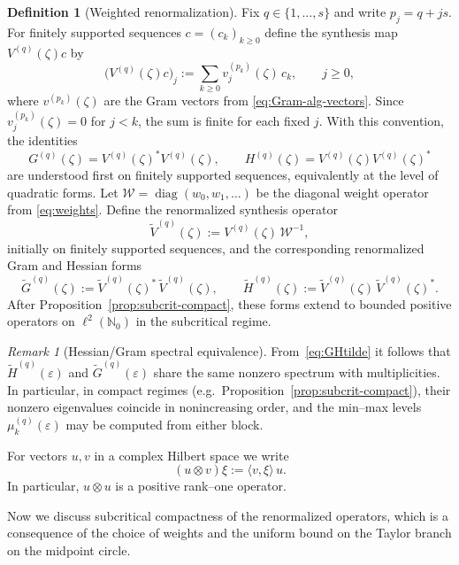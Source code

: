 \documentclass[11pt]{amsart}
\numberwithin{equation}{section}
\theoremstyle{plain}
\theoremstyle{definition}
\newtheorem{definition}[theorem]{Definition}
\theoremstyle{remark}
\newtheorem{remark}[theorem]{Remark}
\newcommand{\N}{\mathbb{N}}
\DeclareMathOperator{\diag}{diag}
\begin{document}
\begin{definition}[Weighted renormalization]\label{def:conjugated-gram}
	Fix $q\in\{1,\dots,s\}$ and write $p_j=q+js$. For finitely supported sequences
	$c=(c_k)_{k\ge0}$ define the synthesis map $V^{(q)}(\zeta)c$ by
	\[
		\bigl(V^{(q)}(\zeta)c\bigr)_j
		:=
		\sum_{k\ge0} v^{(p_k)}_j(\zeta)\,c_k,
		\qquad j\ge0,
	\]
	where $v^{(p_k)}(\zeta)$ are the Gram vectors from \eqref{eq:Gram-alg-vectors}. Since
	$v^{(p_k)}_j(\zeta)=0$ for $j<k$, the sum is finite for each fixed $j$. With this convention, the identities
	\begin{equation}\label{eq:Hq-VV}
		G^{(q)}(\zeta)=V^{(q)}(\zeta)^*V^{(q)}(\zeta),
		\qquad
		H^{(q)}(\zeta)=V^{(q)}(\zeta)V^{(q)}(\zeta)^*
	\end{equation}
	are understood first on finitely supported sequences, equivalently at the level of quadratic forms.
	Let $\mathcal W=\diag(w_0,w_1,\dots)$ be the diagonal weight operator from \eqref{eq:weights}.
	Define the renormalized synthesis operator
	\[
		\widetilde V^{(q)}(\zeta):=V^{(q)}(\zeta)\,\mathcal W^{-1},
	\]
	initially on finitely supported sequences, and the corresponding renormalized Gram and Hessian forms
	\begin{equation}\label{eq:GHtilde}
		\widetilde G^{(q)}(\zeta):=\widetilde V^{(q)}(\zeta)^*\,\widetilde V^{(q)}(\zeta),
		\qquad
		\widetilde H^{(q)}(\zeta):=\widetilde V^{(q)}(\zeta)\,\widetilde V^{(q)}(\zeta)^*.
	\end{equation}
	After Proposition~\ref{prop:subcrit-compact}, these forms extend to bounded positive operators on
	$\ell^2(\N_0)$ in the subcritical regime.
\end{definition}

\begin{remark}[Hessian/Gram spectral equivalence]
	\label{rem:HG-spectrum}
	From~\eqref{eq:GHtilde} it follows that \(\widetilde H^{(q)}(\varepsilon)\) and
	\(\widetilde G^{(q)}(\varepsilon)\) share the same nonzero spectrum with
	multiplicities. In particular, in compact regimes
	(e.g.\ Proposition~\ref{prop:subcrit-compact}), their nonzero eigenvalues
	coincide in nonincreasing order, and the min--max levels
	\(\mu_k^{(q)}(\varepsilon)\) may be computed from either block.
\end{remark}

	For vectors \(u,v\) in a complex Hilbert space we write
	\[
		(u\otimes v)\xi:=\langle v,\xi\rangle\,u.
	\]
	In particular, \(u\otimes u\) is a positive rank--one operator.

Now we discuss subcritical compactness of the renormalized operators, which is a consequence of the choice of weights and the uniform bound on the Taylor branch on the midpoint circle.
\end{document}
